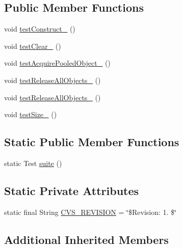 \subsection*{Public Member Functions}
\begin{DoxyCompactItemize}
\item 
void \hyperlink{classorg_1_1jgap_1_1impl_1_1_pool_test_a21f58153dbb1dcf4b6e3282c827453d2}{test\-Construct\-\_} ()
\item 
void \hyperlink{classorg_1_1jgap_1_1impl_1_1_pool_test_a327d6771ab328cd4d1604e10d657fcd8}{test\-Clear\-\_} ()
\item 
void \hyperlink{classorg_1_1jgap_1_1impl_1_1_pool_test_acf00e4ecbd3231d57cd0a8b87abc5c48}{test\-Acquire\-Pooled\-Object\-\_} ()
\item 
void \hyperlink{classorg_1_1jgap_1_1impl_1_1_pool_test_a1393c00755c3ecbba36ddadcdc4d7491}{test\-Release\-All\-Objects\-\_} ()
\item 
void \hyperlink{classorg_1_1jgap_1_1impl_1_1_pool_test_ad24da82ff2bd91d23706924d19432b71}{test\-Release\-All\-Objects\-\_} ()
\item 
void \hyperlink{classorg_1_1jgap_1_1impl_1_1_pool_test_ac33ee46af53597bc4c26ab46f0c32748}{test\-Size\-\_} ()
\end{DoxyCompactItemize}
\subsection*{Static Public Member Functions}
\begin{DoxyCompactItemize}
\item 
static Test \hyperlink{classorg_1_1jgap_1_1impl_1_1_pool_test_ab14c64e34a1dca7fb69336af791a2e53}{suite} ()
\end{DoxyCompactItemize}
\subsection*{Static Private Attributes}
\begin{DoxyCompactItemize}
\item 
static final String \hyperlink{classorg_1_1jgap_1_1impl_1_1_pool_test_a7e7b186d4511161432e00180ee8391c4}{C\-V\-S\-\_\-\-R\-E\-V\-I\-S\-I\-O\-N} = \char`\"{}\$Revision\-: 1. \$\char`\"{}
\end{DoxyCompactItemize}
\subsection*{Additional Inherited Members}


